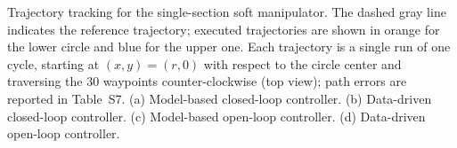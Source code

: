 \caption{Trajectory tracking for the single-section soft manipulator. The dashed gray line indicates the reference trajectory; executed trajectories are shown in orange for the lower circle and blue for the upper one. Each trajectory is a single run of one cycle, starting at $(x, y) = (r, 0)$ with respect to the circle center and traversing the 30 waypoints counter-clockwise (top view); path errors are reported in Table~S7. (a) Model-based closed-loop controller. (b) Data-driven closed-loop controller. (c) Model-based open-loop controller. (d) Data-driven open-loop controller.}
